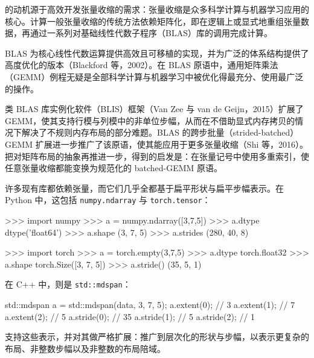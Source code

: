
\CuTe 的动机源于高效开发张量收缩的需求：张量收缩是众多科学计算与机器学习应用的核心。计算一般张量收缩的传统方法依赖矩阵化，即在逻辑上或显式地重组张量数据，再通过一系列对基础线性代数子程序（BLAS）库的调用完成计算。


BLAS 为核心线性代数运算提供高效且可移植的实现，并为广泛的体系结构提供了高度优化的版本（Blackford 等，2002）。在 BLAS 原语中，通用矩阵乘法（GEMM）例程无疑是全部科学计算与机器学习中被优化得最充分、使用最广泛的操作。

类 BLAS 库实例化软件（BLIS）框架（Van Zee 与 van de Geijn，2015）扩展了 GEMM，使其支持行模与列模中的非单位步幅，从而在不借助显式内存拷贝的情况下解决了不规则内存布局的部分难题。BLAS 的跨步批量（strided-batched）GEMM 扩展进一步推广了该原语，使其能应用于更多张量收缩（Shi 等，2016）。把对矩阵布局的抽象再推进一步，\CuTe 得到的启发是：在张量记号中使用多重索引，使任意张量收缩都能变换为规范化的 batched-GEMM 原语。

许多现有库都依赖张量，而它们几乎全都基于扁平形状与扁平步幅表示。在 Python 中，这包括 {\tt numpy.ndarray} 与 {\tt torch.tensor}：

\noindent
\begin{minipage}[t]{0.48\textwidth}
\begin{python}
>>> import numpy
>>> a = numpy.ndarray([3,7,5])
>>> a.dtype
dtype('float64')
>>> a.shape
(3, 7, 5)
>>> a.strides
(280, 40, 8)
\end{python}
\end{minipage}
\hfill
\begin{minipage}[t]{0.48\textwidth}
\begin{python}
>>> import torch
>>> a = torch.empty(3,7,5)
>>> a.dtype
torch.float32
>>> a.shape
torch.Size([3, 7, 5])
>>> a.stride()
(35, 5, 1)
\end{python}
\end{minipage}

\noindent 在 C++ 中，则是 {\tt std::mdspan}：

\noindent
\begin{cpp}
std::mdspan a = std::mdspan(data, 3, 7, 5);
a.extent(0);  // 3
a.extent(1);  // 7
a.extent(2);  // 5
a.stride(0);  // 35
a.stride(1);  // 5
a.stride(2);  // 1
\end{cpp}

\noindent \CuTe 支持这些表示，并对其做严格扩展：推广到层次化的形状与步幅，以表示更复杂的布局、非整数步幅以及非整数的布局陪域。

